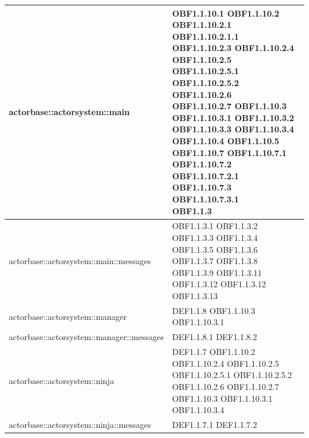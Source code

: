 \documentclass{scalatekids-article}
\begin{document}
\begin{longtable}[H]{|p{9cm}|p{8cm}|}
\hline
actorbase::actorsystem::main & \multiLineCell[t]{OBF1.1.10.1 OBF1.1.10.2\\OBF1.1.10.2.1 OBF1.1.10.2.1.1\\OBF1.1.10.2.3 OBF1.1.10.2.4\\OBF1.1.10.2.5 OBF1.1.10.2.5.1\\OBF1.1.10.2.5.2 OBF1.1.10.2.6\\OBF1.1.10.2.7 OBF1.1.10.3\\OBF1.1.10.3.1 OBF1.1.10.3.2\\OBF1.1.10.3.3 OBF1.1.10.3.4\\OBF1.1.10.4 OBF1.1.10.5\\OBF1.1.10.7 OBF1.1.10.7.1\\OBF1.1.10.7.2 OBF1.1.10.7.2.1\\OBF1.1.10.7.3 OBF1.1.10.7.3.1\\OBF1.1.3\\}\\
\hline
actorbase::actorsystem::main::messages & \multiLineCell[t]{OBF1.1.3.1 OBF1.1.3.2\\OBF1.1.3.3 OBF1.1.3.4\\OBF1.1.3.5 OBF1.1.3.6\\OBF1.1.3.7 OBF1.1.3.8\\OBF1.1.3.9 OBF1.1.3.11\\OBF1.1.3.12 OBF1.1.3.12\\OBF1.1.3.13}\\
\hline
actorbase::actorsystem::manager & \multiLineCell[t]{DEF1.1.8 OBF1.1.10.3\\OBF1.1.10.3.1\\}\\
\hline
actorbase::actorsystem::manager::messages & \multiLineCell[t]{DEF1.1.8.1 DEF1.1.8.2\\}\\
\hline
actorbase::actorsystem::ninja & \multiLineCell[t]{DEF1.1.7 OBF1.1.10.2\\OBF1.1.10.2.4 OBF1.1.10.2.5\\OBF1.1.10.2.5.1 OBF1.1.10.2.5.2\\OBF1.1.10.2.6 OBF1.1.10.2.7\\OBF1.1.10.3 OBF1.1.10.3.1\\OBF1.1.10.3.4\\}\\
\hline
actorbase::actorsystem::ninja::messages & \multiLineCell[t]{DEF1.1.7.1 DEF1.1.7.2\\}\\
\hline

\end{longtable}
\end{document}
